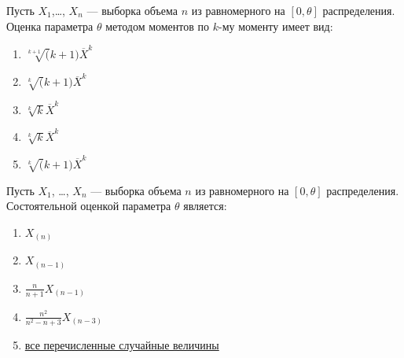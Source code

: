 \documentclass[t]{beamer}
\begin{document}
 \begin{frame} \label{3} 
\begin{block}{3} 

Пусть $X_1$,\ldots, $X_n$ — выборка объема $n$ из равномерного на $[0, \theta]$ распределения. Оценка параметра $\theta$ методом моментов по $k$-му моменту имеет вид:
 


 \end{block} 
\begin{enumerate} 
\item[] \hyperlink{3-No}{\beamergotobutton{} $\sqrt[k+1](k+1) \overline X^k$}
\item[] \hyperlink{3-Yes}{\beamergotobutton{} $\sqrt[k](k+1) \overline X^k$}
\item[] \hyperlink{3-No}{\beamergotobutton{} $\sqrt[k]k \overline X^k$}
\item[] \hyperlink{3-No}{\beamergotobutton{} $\sqrt[k]k \overline X^k$}
\item[] \hyperlink{3-No}{\beamergotobutton{} $\sqrt[k](k+1) \overline X^k$}
\end{enumerate} 
\end{frame} 


 \begin{frame} \label{4} 
\begin{block}{4} 

Пусть $X_1$, \ldots, $X_n$ — выборка объема $n$ из равномерного на $[0, \theta]$ распределения. Состоятельной оценкой параметра $\theta$ является:
 


 \end{block} 
\begin{enumerate} 
\item[] \hyperlink{4-No}{\beamergotobutton{} $X_{(n)}$}
\item[] \hyperlink{4-No}{\beamergotobutton{} $X_{(n-1)}$}
\item[] \hyperlink{4-No}{\beamergotobutton{} $\frac{n}{n+1} X_{(n-1)}$}
\item[] \hyperlink{4-No}{\beamergotobutton{} $\frac{n^2}{n^2-n+3} X_{(n-3)}$}
\item[] \hyperlink{4-Yes}{\beamergotobutton{} все перечисленные случайные величины}
\end{enumerate} 
\end{frame} 
\end{document}
